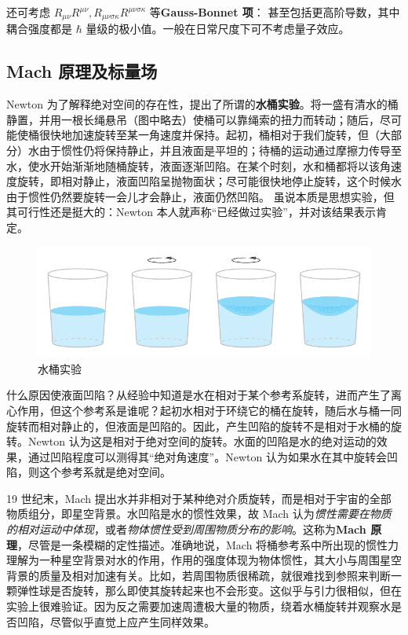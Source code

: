 还可考虑 $R_{\mu\nu} R^{\mu\nu},R_{\mu\nu\sigma\kappa}R^{\mu\nu\sigma\kappa}$ 等\textbf{Gauss-Bonnet 项}：
甚至包括更高阶导数，其中耦合强度都是 $\hbar$ 量级的极小值。一般在日常尺度下可不考虑量子效应。

\subsection{Mach 原理及标量场}

Newton 为了解释绝对空间的存在性，提出了所谓的\textbf{水桶实验}。将一盛有清水的桶静置，并用一根长绳悬吊（图中略去）使桶可以靠绳索的扭力而转动；随后，尽可能使桶很快地加速旋转至某一角速度并保持。起初，桶相对于我们旋转，但（大部分）水由于惯性仍将保持静止，并且液面是平坦的；待桶的运动通过摩擦力传导至水，使水开始渐渐地随桶旋转，液面逐渐凹陷。在某个时刻，水和桶都将以该角速度旋转，即相对静止，液面凹陷呈抛物面状；尽可能很快地停止旋转，这个时候水由于惯性仍然要旋转一会儿才会静止，液面仍然凹陷。
虽说本质是思想实验，但其可行性还是挺大的：Newton 本人就声称“已经做过实验”，并对该结果表示肯定。
\begin{figure}[ht]\centering
    \includegraphics{fig/chpt01/spinning bucket.pdf}
    \caption{水桶实验}
\end{figure}
什么原因使液面凹陷？从经验中知道是水在相对于某个参考系旋转，进而产生了离心作用，但这个参考系是谁呢？起初水相对于环绕它的桶在旋转，随后水与桶一同旋转而相对静止的，但液面是凹陷的。因此，产生凹陷的旋转不是相对于水桶的旋转。Newton 认为这是相对于绝对空间的旋转。水面的凹陷是水的绝对运动的效果，通过凹陷程度可以测得其“绝对角速度”。Newton 认为如果水在其中旋转会凹陷，则这个参考系就是绝对空间。

19 世纪末，Mach 提出水并非相对于某种绝对介质旋转，而是相对于宇宙的全部物质组分，即星空背景。水凹陷是水的惯性效果，故 Mach 认为\textit{惯性需要在物质的相对运动中体现}，或者\textit{物体惯性受到周围物质分布的影响}。这称为\textbf{Mach 原理}，尽管是一条模糊的定性描述。准确地说，Mach 将桶参考系中所出现的惯性力理解为一种星空背景对水的作用，作用的强度体现为物体惯性，其大小与周围星空背景的质量及相对加速有关。比如，若周围物质很稀疏，就很难找到参照来判断一颗弹性球是否旋转，那么即使其旋转起来也不会形变。这似乎与引力很相似，但在实验上很难验证。因为反之需要加速周遭极大量的物质，绕着水桶旋转并观察水是否凹陷，尽管似乎直觉上应产生同样效果。

